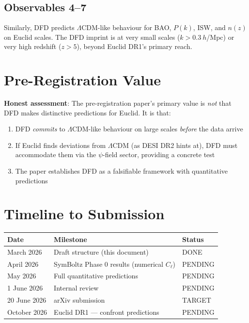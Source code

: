 \documentclass[11pt,a4paper]{article}
\begin{document}
\subsection{Observables 4--7}

Similarly, DFD predicts $\Lambda$CDM-like behaviour for BAO, $P(k)$, ISW, and $n(z)$ on Euclid scales. The DFD imprint is at very small scales ($k > 0.3~h$/Mpc) or very high redshift ($z > 5$), beyond Euclid DR1's primary reach.

\section{Pre-Registration Value}

\textbf{Honest assessment}: The pre-registration paper's primary value is \emph{not} that DFD makes distinctive predictions for Euclid. It is that:

\begin{enumerate}
\item DFD \emph{commits} to $\Lambda$CDM-like behaviour on large scales \emph{before} the data arrive
\item If Euclid finds deviations from $\Lambda$CDM (as DESI DR2 hints at), DFD must accommodate them via the $\psi$-field sector, providing a concrete test
\item The paper establishes DFD as a falsifiable framework with quantitative predictions
\end{enumerate}

\section{Timeline to Submission}

\begin{center}
\begin{tabular}{lll}
\toprule
\textbf{Date} & \textbf{Milestone} & \textbf{Status} \\
\midrule
March 2026 & Draft structure (this document) & DONE \\
April 2026 & SymBoltz Phase 0 results (numerical $C_\ell$) & PENDING \\
May 2026 & Full quantitative predictions & PENDING \\
1 June 2026 & Internal review & PENDING \\
20 June 2026 & arXiv submission & TARGET \\
October 2026 & Euclid DR1 --- confront predictions & PENDING \\
\bottomrule
\end{tabular}
\end{center}
\end{document}
